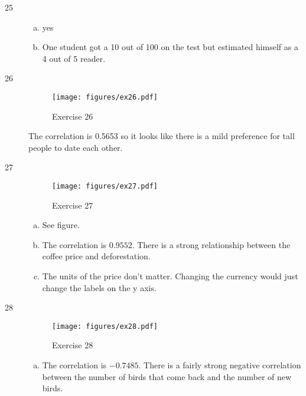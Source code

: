 \documentclass[letterpaper, landscape]{exam}
\begin{document}
  \ifprintanswers{}
    \begin{description}
      \item[25]     
        \begin{enumerate}[(a)]
          \item yes
          \item One student got a 10 out of 100 on the test but estimated
            himself as a 4 out of 5 reader.  
        \end{enumerate}
    
      \item[26]
        \begin{figure}[H]
          \centering
          \texttt{[image: figures/ex26.pdf]}
          \caption{Exercise 26}\label{fig:ex26}
        \end{figure}

        The correlation is 0.5653 so it looks like there is a mild preference
        for tall people to date each other.

      \item[27]
        \begin{figure}[H]
          \centering
          \texttt{[image: figures/ex27.pdf]}
          \caption{Exercise 27}
        \end{figure}\label{fig:ex27}

        \begin{enumerate}[(a)]
          \item See figure.

          \item
            The correlation is $0.9552$.  There is a strong relationship between the
            coffee price and deforestation.

          \item
            The units of the price don't matter.  Changing the currency would
            just change the labels on the y axis.

        \end{enumerate}

      \item[28]
        \begin{figure}[H]
          \centering
          \texttt{[image: figures/ex28.pdf]}
          \caption{Exercise 28}
        \end{figure}\label{fig:ex28}

        \begin{enumerate}[(a)]
          \item The correlation is $-0.7485$.  There is a fairly strong negative
            correlation between the number of birds that come back and the
            number of new birds.


\end{enumerate}
\end{description}
\end{document}

